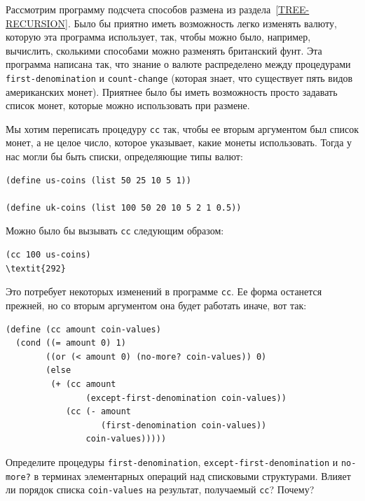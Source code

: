 \begin{exercise}{2.19}\label{EX2.19}%
Рассмотрим программу подсчета способов размена из
раздела~\ref{TREE-RECURSION}.  Было бы приятно иметь
возможность легко изменять валюту, которую эта программа использует,
так, чтобы можно было, например, вычислить, сколькими способами можно
разменять британский фунт.  Эта программа написана так, что знание о
валюте распределено между процедурами
{\tt first-denomination} и
{\tt count-change} (которая знает, что существует пять видов
американских монет).  Приятнее было бы иметь возможность просто
задавать список монет, которые можно использовать при размене.

Мы хотим переписать процедуру {\tt cc} так,
чтобы ее вторым аргументом был список монет, а не целое число, которое 
указывает, какие монеты использовать. Тогда у нас могли бы быть
списки, определяющие типы валют:

\begin{Verbatim}[fontsize=\small]
(define us-coins (list 50 25 10 5 1))

(define uk-coins (list 100 50 20 10 5 2 1 0.5))
\end{Verbatim}
Можно было бы вызывать {\tt cc} следующим образом:

\begin{Verbatim}[fontsize=\small]
(cc 100 us-coins)
\textit{292}
\end{Verbatim}
Это потребует некоторых изменений в программе {\tt cc}.  Ее
форма останется прежней, но со вторым аргументом она будет работать
иначе, вот так:

\begin{Verbatim}[fontsize=\small]
(define (cc amount coin-values)
  (cond ((= amount 0) 1)
        ((or (< amount 0) (no-more? coin-values)) 0)
        (else
         (+ (cc amount
                (except-first-denomination coin-values))
            (cc (- amount
                   (first-denomination coin-values))
                coin-values)))))
\end{Verbatim}
Определите процедуры {\tt first-denomination},
{\tt except-first-denomination} и {\tt no-more?} в
терминах элементарных операций над списковыми структурами.  Влияет ли
порядок списка {\tt coin-values} на результат, получаемый
{\tt cc}? Почему?
{\sloppy

}
\end{exercise}
